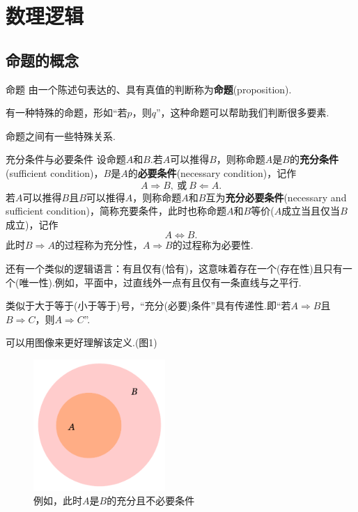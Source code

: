 \documentclass[lang=cn, zihao=5]{elegantbook}
\begin{document}
\section{数理逻辑}

\subsection{命题的概念}

\begin{definition}{命题}
	由一个陈述句表达的、具有真值的判断称为\textbf{命题}(proposition).
\end{definition}
\begin{remark}
	有一种特殊的命题，形如“若$p$，则$q$”，这种命题可以帮助我们判断很多要素.
\end{remark}

命题之间有一些特殊关系.

\begin{definition}{充分条件与必要条件} %
	设命题$A$和$B$.若$A$可以推得$B$，则称命题$A$是$B$的\textbf{充分条件}(sufficient condition)，$B$是$A$的\textbf{必要条件}(necessary condition)，记作$$A \Rightarrow B,~\text{或}~B \Leftarrow A.$$
	若$A$可以推得$B$且$B$可以推得$A$，则称命题$A$和$B$互为\textbf{充分必要条件}(necessary and sufficient condition)，简称充要条件，此时也称命题$A$和$B$等价($A$成立当且仅当$B$成立)，记作$$A \Leftrightarrow B.$$
	此时$B \Rightarrow A$的过程称为充分性，$A \Rightarrow B$的过程称为必要性.
\end{definition}
\begin{remark}
	还有一个类似的逻辑语言：有且仅有(恰有)，这意味着存在一个(存在性)且只有一个(唯一性).例如，平面中，过直线外一点有且仅有一条直线与之平行.
\end{remark}
\begin{remark}
	类似于大于等于(小于等于)号，“充分(必要)条件”具有传递性.即“若$A \Rightarrow B$且$B \Rightarrow C$，则$A \Rightarrow C$”.
\end{remark}

可以用图像来更好理解该定义.(图1)

\begin{figure}[h!]
	\centering
	\includegraphics[width=5cm]{attachment/202302191.pdf}
	\caption{例如，此时$A$是$B$的充分且不必要条件}
\end{figure}
\end{document}
